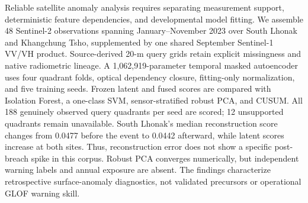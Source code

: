 Reliable satellite anomaly analysis requires separating measurement support, deterministic feature dependencies, and developmental model fitting. We assemble 48 Sentinel-2 observations spanning January--November 2023 over South Lhonak and Khangchung Tsho, supplemented by one shared September Sentinel-1 VV/VH product. Source-derived 20-m query grids retain explicit missingness and native radiometric lineage. A 1,062,919-parameter temporal masked autoencoder uses four quadrant folds, optical dependency closure, fitting-only normalization, and five training seeds. Frozen latent and fused scores are compared with Isolation Forest, a one-class SVM, sensor-stratified robust PCA, and CUSUM. All 188 genuinely observed query quadrants per seed are scored; 12 unsupported quadrants remain unavailable. South Lhonak's median reconstruction score changes from 0.0477 before the event to 0.0442 afterward, while latent scores increase at both sites. Thus, reconstruction error does not show a specific post-breach spike in this corpus. Robust PCA converges numerically, but independent warning labels and annual exposure are absent. The findings characterize retrospective surface-anomaly diagnostics, not validated precursors or operational GLOF warning skill.
